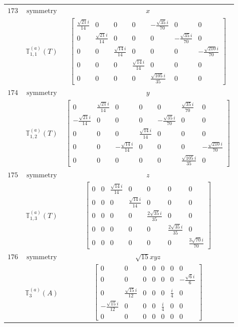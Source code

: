\documentclass[fleqn,8pt,landscape]{jsarticle}
\begin{document}
\begin{longtable}{ccc}
$ 173 $ & $ \text{symmetry} $ & $ x $ \\
$  $ & $ \mathbb{T}_{1,1}^{(a)}(T) $ & $ \begin{bmatrix} \frac{\sqrt{21} i}{14} & 0 & 0 & 0 & - \frac{\sqrt{35} i}{70} & 0 & 0 \\ 0 & \frac{\sqrt{21} i}{14} & 0 & 0 & 0 & - \frac{\sqrt{35} i}{70} & 0 \\ 0 & 0 & \frac{\sqrt{14} i}{14} & 0 & 0 & 0 & - \frac{\sqrt{210} i}{70} \\ 0 & 0 & 0 & \frac{\sqrt{14} i}{14} & 0 & 0 & 0 \\ 0 & 0 & 0 & 0 & \frac{\sqrt{105} i}{35} & 0 & 0 \end{bmatrix} $ \\ \hline
$ 174 $ & $ \text{symmetry} $ & $ y $ \\
$  $ & $ \mathbb{T}_{1,2}^{(a)}(T) $ & $ \begin{bmatrix} 0 & \frac{\sqrt{21} i}{14} & 0 & 0 & 0 & \frac{\sqrt{35} i}{70} & 0 \\ - \frac{\sqrt{21} i}{14} & 0 & 0 & 0 & - \frac{\sqrt{35} i}{70} & 0 & 0 \\ 0 & 0 & 0 & \frac{\sqrt{14} i}{14} & 0 & 0 & 0 \\ 0 & 0 & - \frac{\sqrt{14} i}{14} & 0 & 0 & 0 & - \frac{\sqrt{210} i}{70} \\ 0 & 0 & 0 & 0 & 0 & \frac{\sqrt{105} i}{35} & 0 \end{bmatrix} $ \\ \hline
$ 175 $ & $ \text{symmetry} $ & $ z $ \\
$  $ & $ \mathbb{T}_{1,3}^{(a)}(T) $ & $ \begin{bmatrix} 0 & 0 & \frac{\sqrt{14} i}{14} & 0 & 0 & 0 & 0 \\ 0 & 0 & 0 & \frac{\sqrt{14} i}{14} & 0 & 0 & 0 \\ 0 & 0 & 0 & 0 & \frac{2 \sqrt{35} i}{35} & 0 & 0 \\ 0 & 0 & 0 & 0 & 0 & \frac{2 \sqrt{35} i}{35} & 0 \\ 0 & 0 & 0 & 0 & 0 & 0 & \frac{3 \sqrt{70} i}{70} \end{bmatrix} $ \\ \hline
$ 176 $ & $ \text{symmetry} $ & $ \sqrt{15} x y z $ \\
$  $ & $ \mathbb{T}_{3}^{(a)}(A) $ & $ \begin{bmatrix} 0 & 0 & 0 & 0 & 0 & 0 & 0 \\ 0 & 0 & 0 & 0 & 0 & 0 & - \frac{\sqrt{6} i}{6} \\ 0 & \frac{\sqrt{15} i}{12} & 0 & 0 & 0 & \frac{i}{4} & 0 \\ - \frac{\sqrt{15} i}{12} & 0 & 0 & 0 & \frac{i}{4} & 0 & 0 \\ 0 & 0 & 0 & 0 & 0 & 0 & 0 \end{bmatrix} $ \\ \hline

\end{longtable}
\end{document}
